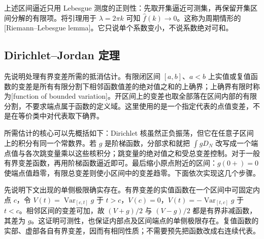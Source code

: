 上述区间逼近只用 Lebesgue 测度的正则性：先取开集逼近可测集，再保留开集区间分解的有限项。将引理用于 \(\lambda=2\pi k\) 可知 \(\widehat f(k)\to0\)。这称为周期情形的[Riemann--Lebesgue lemma]。它只说单个系数变小，不说系数绝对可和。

\subsection{Dirichlet--Jordan 定理}
\label{b2:subsec:020203}

先说明处理有界变差所需的抵消估计。有限闭区间 \([a,b]\)、\(a<b\) 上实值或复值函数的变差是所有有限分割下相邻函数值差的绝对值之和的上确界；上确界有限时称为[function of bounded variation]。开区间上的变差也取全部落在区间内部的有限分割，不要求端点属于函数的定义域。这里使用的是一个指定代表的点值变差，不是在等价类中对代表取下确界。

所需估计的核心可以先概括如下：Dirichlet 核虽然正负振荡，但它在任意子区间上的积分有同一个常数界。若 \(g\) 是阶梯函数，分部求和就把 \(\int gD_N\) 改写成一个端点值与各次跳变量乘以这些核积分；跳变量的绝对值之和受总变差控制。对于一般有界变差函数，再用阶梯函数逼近即可。最后缩小原点附近的区间：\(g(0+)=0\) 使端点值趋零，有限总变差则使小区间中的变差趋零。下面依次实现这几个步骤。

先说明下文出现的单侧极限确实存在。有界变差的实值函数在一个区间中可固定内点 \(c\)，令 \(V(t)=\operatorname{Var}_{[c,t]}g\) 于 \(t>c\)，\(V(c)=0\)，\(V(t)=-\operatorname{Var}_{[t,c]}g\) 于 \(t<c\)。相邻区间的变差可加，故 \((V+g)/2\) 与 \((V-g)/2\) 都是有界非减函数，其差为 \(g\)。这证明可测性，也保证内部点及区间端点的单侧极限存在。复值函数的实部、虚部各自有界变差，因而有相同性质；不需要预先把函数改成右连续代表。

